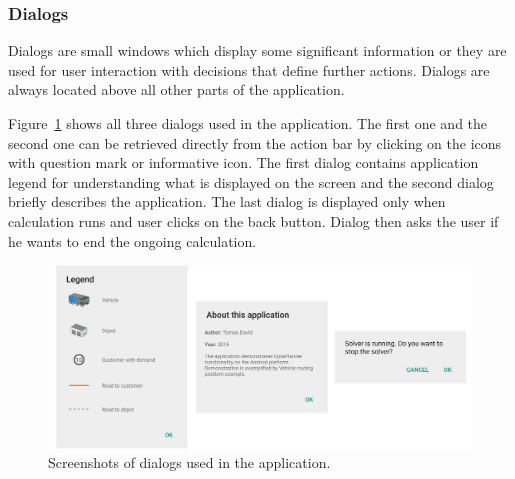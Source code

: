 \subsubsection{Dialogs}
Dialogs are small windows which display some significant information or they are used for user interaction with
decisions that define further actions. Dialogs are always located above all other parts of the application.

Figure~\ref{DialogsFigure} shows all three dialogs used in the application. The first one and the second one can be
retrieved directly from the action bar by clicking on the icons with question mark or informative icon. The first dialog
contains application legend for understanding what is displayed on the screen and the second dialog briefly describes
the application. The last dialog is displayed only when calculation runs and user clicks on the back button. Dialog then
asks the user if he wants to end the ongoing calculation.
\\
\begin{figure}[h!]
    \centering
    \includegraphics[scale=0.15]{fig/dialogs.png}
    \caption{Screenshots of dialogs used in the application.}
    \label{DialogsFigure}
\end{figure}
